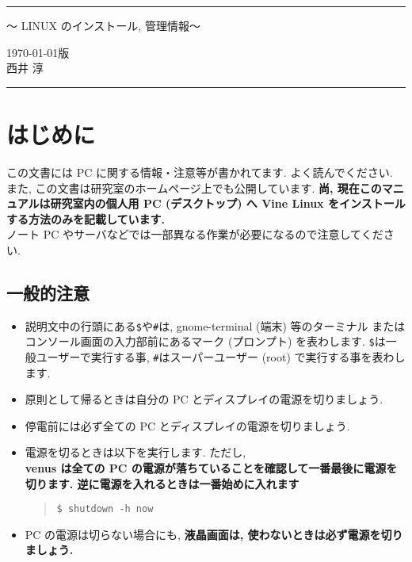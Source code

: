 \documentclass{jarticle}
\begin{document}
\pagestyle{empty}
\rule{\linewidth}{0.3pt}
\begin{center}
  {\Large 〜 LINUX のインストール, 管理情報〜}
\end{center}
\begin{flushright}
\today 版\\
西井 淳
\end{flushright}
\rule{\linewidth}{0.3pt}
\newpage
{\small
\tableofcontents
}

\newpage


\pagestyle{fancy}

\section{はじめに}
この文書には PC に関する情報・注意等が書かれてます. よく読んでください.
また, この文書は研究室のホームページ上でも公開しています.
\textbf{尚, 現在このマニュアルは研究室内の個人用 PC (デスクトップ) へ
Vine Linux をインストールする方法のみを記載しています. }\\
ノート PC やサーバなどでは一部異なる作業が必要になるので注意してください.

\subsection{一般的注意}

\begin{itemize}
	\item 説明文中の行頭にある\verb|$|や\verb|#|は, gnome-terminal (端末) 等のターミナル
	      またはコンソール画面の入力部前にあるマーク (プロンプト) を表わします.
	      \verb|$|は一般ユーザーで実行する事, \verb|#|はスーパーユーザー (root)
	      で実行する事を表わします.
	\item 原則として帰るときは自分の PC とディスプレイの電源を切りましょう.
	\item 停電前には必ず全ての PC とディスプレイの電源を切りましょう.
	\item 電源を切るときは以下を実行します. ただし, \\
	      \textbf{venus は全ての PC の電源が落ちていることを確認して一番最後に電源を切ります.
	      逆に電源を入れるときは一番始めに入れます}
		\begin{quote}
\begin{verbatim}
$ shutdown -h now
\end{verbatim}
		\end{quote}
	\item PC の電源は切らない場合にも, \textbf{液晶画面は, 使わないときは必ず電源を切りましょう. }
\end{itemize}
\end{document}
